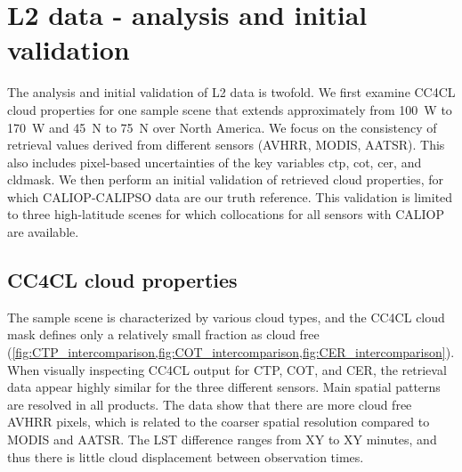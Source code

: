 \section{L2 data - analysis and initial validation}\label{L2_data}

The analysis and initial validation of L2 data is twofold. We first examine CC4CL cloud properties for one sample scene that extends approximately from 100\textdegree\ W to 170\textdegree\ W and 45\textdegree\ N to 75\textdegree\ N over North America. We focus on the consistency of retrieval values derived from different sensors (AVHRR, MODIS, AATSR). This also includes pixel-based uncertainties of the key variables ctp, cot, cer, and cldmask. We then perform an initial validation of retrieved cloud properties, for which CALIOP-CALIPSO data are our truth reference. This validation is limited to three high-latitude scenes for which collocations for all sensors with CALIOP are available.

 
\subsection{CC4CL cloud properties}

The sample scene is characterized by various cloud types, and the CC4CL cloud mask defines only a relatively small fraction as cloud free (\cref{fig:CTP_intercomparison,fig:COT_intercomparison,fig:CER_intercomparison}).  When visually inspecting CC4CL output for CTP, COT, and CER, the retrieval data appear highly similar for the three different sensors. Main spatial patterns are resolved in all products. The data show that there are more cloud free AVHRR pixels, which is related to the coarser spatial resolution compared to MODIS and AATSR. The LST difference ranges from XY to XY minutes, and thus there is little cloud displacement between observation times.
 
